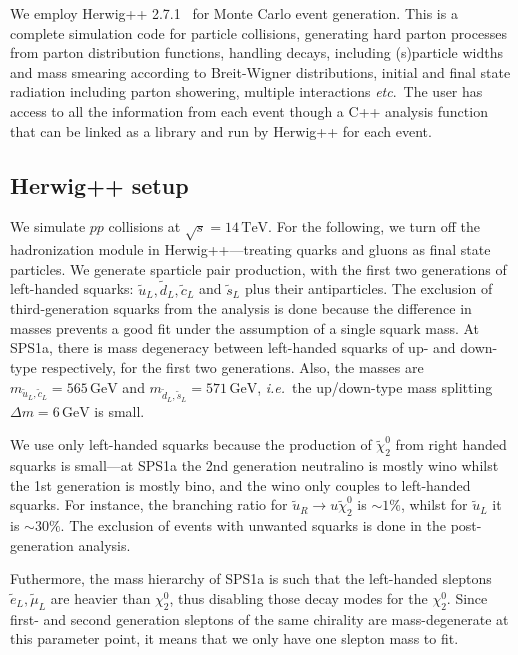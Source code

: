 \documentclass[twoside,english]{uiofysmaster}
\begin{document}
We employ {\ttfamily Herwig++  2.7.1}~\cite{Bahr:2008pv} for Monte Carlo event generation. This is a complete simulation code for particle collisions, generating hard parton processes from parton distribution functions, handling decays, including (s)particle widths and mass smearing according to Breit-Wigner distributions, initial and final state radiation including parton showering, multiple interactions {\it etc}.\ The user has access to all the information from each event though a {\ttfamily C++} analysis function that can be linked as a library and run by {\ttfamily Herwig++} for each event.

\subsection{{\ttfamily Herwig++} setup}

We simulate $pp$ collisions at $\sqrt{s}=14 \, \mathrm{TeV}$. For the following, we turn off the hadronization module in {\ttfamily Herwig++}---treating quarks and gluons as final state particles. 
We generate sparticle pair production, with the first two generations of left-handed squarks: $\tilde{u}_L,\tilde{d}_L,\tilde{c}_L$ and $\tilde{s}_L$ plus their antiparticles. The exclusion of third-generation squarks from the analysis is done because the difference in masses prevents a good fit under the assumption of a single squark mass. At SPS1a, there is mass degeneracy between left-handed squarks of up- and down-type respectively, for the first two generations. Also, the masses are $m_{\tilde u_L, \tilde c_L} = 565 \,\mathrm{GeV}$ and $m_{\tilde d_L, \tilde s_L} = 571 \, \mathrm{GeV}$, {\it i.e.}\ the up/down-type mass splitting $\Delta m = 6 \, \mathrm{GeV}$ is small. 

We use only left-handed squarks because the production of $\tilde \chi_2^0$ from right handed squarks is small---at SPS1a the 2nd generation neutralino is mostly wino whilst the 1st generation is mostly bino, and the wino only couples to left-handed squarks. For instance, the branching ratio for $\tilde u_R \to u \tilde \chi_2^0$ is $\sim 1 \%$, whilst for $\tilde u_L$ it is $\sim 30 \%$. The exclusion of events with unwanted squarks is done in the post-generation analysis.

Futhermore, the mass hierarchy of SPS1a is such that the left-handed sleptons $\tilde e_L, \tilde \mu_L$ are heavier than $\chi_2^0$, thus disabling those decay modes for the $\chi_2^0$. Since first- and second generation sleptons of the same chirality are mass-degenerate at this parameter point, it means that we only have one slepton mass to fit.
\end{document}

